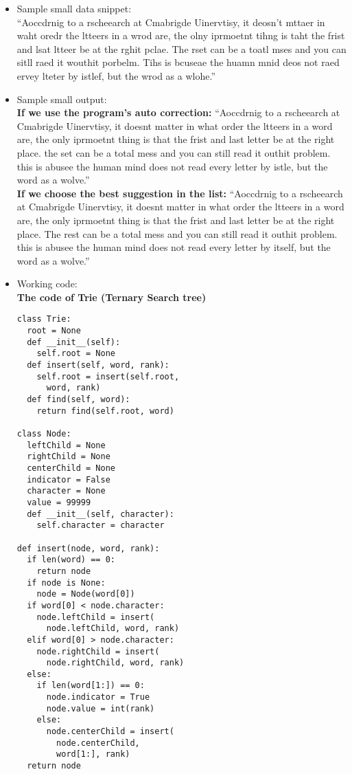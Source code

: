 \begin{itemize} 
\item{}
Sample small data snippet: \\
``Aoccdrnig to a rscheearch at Cmabrigde Uinervtisy, it deosn't mttaer in waht oredr the ltteers in a wrod are, the olny iprmoetnt tihng is taht the frist and lsat ltteer be at the rghit pclae. The rset can be a toatl mses and you can sitll raed it wouthit porbelm. Tihs is bcuseae the huamn mnid deos not raed ervey lteter by istlef, but the wrod as a wlohe.''
\item{}
Sample small output: \\
\textbf{If we use the program's auto correction:} ``Aoccdrnig to a rscheearch at Cmabrigde Uinervtisy, it doesnt matter in what order the ltteers in a word are, the only iprmoetnt thing is that the frist and last letter be at the right place. the set can be a total mess and you can still read it outhit problem. this is abusee the human mind does not read every letter by istle, but the word as a wolve.'' \\
\textbf{If we choose the best suggestion in the list:} ``Aoccdrnig to a rscheearch at Cmabrigde Uinervtisy, it doesnt matter in what order the ltteers in a word are, the only iprmoetnt thing is that the frist and last letter be at the right place. The rest can be a total mess and you can still read it outhit problem. this is abusee the human mind does not read every letter by itself, but the word as a wolve.''
\item{}

Working code: \\
\textbf{The code of Trie (Ternary Search tree)} \\
\begin{verbatim}
class Trie:
  root = None
  def __init__(self):
    self.root = None
  def insert(self, word, rank):
    self.root = insert(self.root,
      word, rank)
  def find(self, word):
    return find(self.root, word)

class Node:
  leftChild = None
  rightChild = None
  centerChild = None
  indicator = False
  character = None
  value = 99999
  def __init__(self, character):
    self.character = character

def insert(node, word, rank):
  if len(word) == 0:
    return node
  if node is None:
    node = Node(word[0])
  if word[0] < node.character:
    node.leftChild = insert(
      node.leftChild, word, rank)
  elif word[0] > node.character:
    node.rightChild = insert(
      node.rightChild, word, rank)
  else:
    if len(word[1:]) == 0:
      node.indicator = True
      node.value = int(rank)
    else:
      node.centerChild = insert(
        node.centerChild, 
        word[1:], rank)
  return node


\end{verbatim}
\end{itemize}
